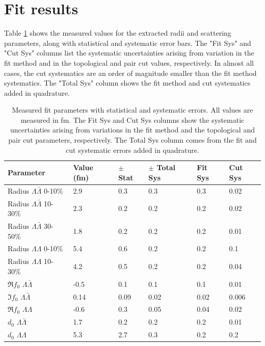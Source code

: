 \section{Fit results}
\label{sec:FitResults}

Table \ref{tab:FitParams} shows the measured values for the extracted radii and scattering parameters, along with statistical and systematic error bars.
The "Fit Sys" and "Cut Sys" columns list the systematic uncertainties arising from variation in the fit method and in the topological and pair cut values, respectively.
In almost all cases, the cut systematics are an order of magnitude smaller than the fit method systematics.
The "Total Sys" column shows the fit method and cut systematics added in quadrature.


\begin{table}
\label{FitResultsTable}
\begin{center}
\begin{tabular}{|l|l|l|l|l|l|}
\hline 
Parameter & Value (fm) & $\pm$ Stat & $\pm$ Total Sys & Fit Sys & Cut Sys \\ 
\hline 
Radius $\Lambda\bar{\Lambda}$ 0-10\% & 2.9 & 0.3 & 0.3 & 0.3 & 0.02 \\ 
\hline 
Radius $\Lambda\bar{\Lambda}$ 10-30\%  & 2.3 & 0.2 & 0.2 & 0.2 & 0.02 \\ 
\hline 
Radius $\Lambda\bar{\Lambda}$ 30-50\%  & 1.8 & 0.2 & 0.2 & 0.2 & 0.01 \\ 
\hline 
Radius $\Lambda\Lambda$ 0-10\% & 5.4 & 0.6 & 0.2 & 0.2 & 0.1 \\ 
\hline 
Radius $\Lambda\Lambda$ 10-30\% & 4.2 & 0.5 & 0.2 & 0.2 & 0.04 \\ 
\hline 
$\Re f_0$ $\Lambda\bar{\Lambda}$ & -0.5 & 0.1 & 0.1 & 0.1 & 0.01 \\ 
\hline 
$\Im f_0$ $\Lambda\bar{\Lambda}$ & 0.14 & 0.09 & 0.02 & 0.02 & 0.006 \\ 
\hline 
$\Re f_0$ $\Lambda\Lambda$ & -0.6 & 0.3 & 0.05 & 0.04 & 0.02 \\ 
\hline 
$d_0$ $\Lambda\bar{\Lambda}$ & 1.7 & 0.2 & 0.2 & 0.2 & 0.01 \\ 
\hline 
$d_0$ $\Lambda\Lambda$ & 5.3 & 2.7 & 0.3 & 0.2 & 0.2 \\ 
\hline 
\end{tabular} 
\end{center}
\caption[Fit results]{Measured fit parameters with statistical and systematic errors.
All values are measured in fm.
The Fit Sys and Cut Sys columns show the systematic uncertainties arising from variations in the fit method and the topological and pair cut parameters, respectively.
The Total Sys column comes from the fit and cut systematic errors added in quadrature. }
\label{tab:FitParams}
\end{table}






